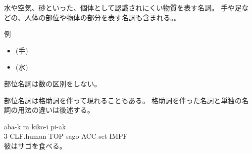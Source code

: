水や空気、砂といった、個体として認識されにくい物質を表す名詞。
手や足などの、人体の部位や物体の部分を表す名詞も含まれる。。

例
\begin{itemize}
\item {} (手)
\item {} (水)
\end{itemize}

部位名詞は数の区別をしない。

部位名詞は格助詞を伴って現れることもある。
格助詞を伴った名詞と単独の名詞の用法の違いは後述する。

\begin{exe}
    \ex \gll aba-k ra kiko-i pi-ak \\
        3-CLF.human TOP sago-ACC set-IMPF \\
        \glt 彼はサゴを食べる。
\end{exe}
